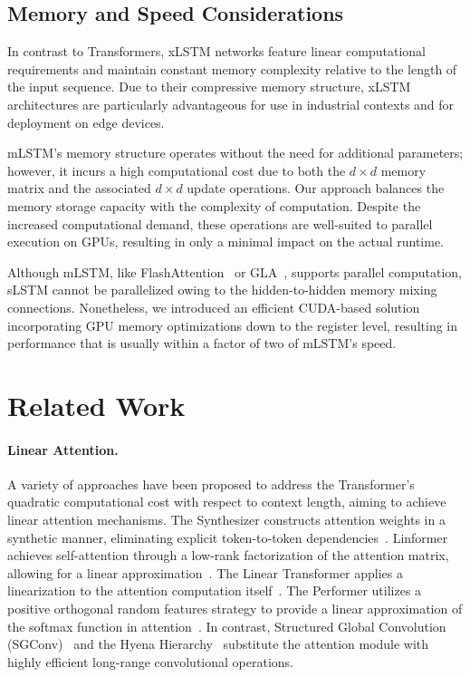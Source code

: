 \subsection{Memory and Speed Considerations}

In contrast to Transformers, xLSTM networks feature linear computational requirements and maintain constant memory complexity relative to the length of the input sequence. Due to their compressive memory structure, xLSTM architectures are particularly advantageous for use in industrial contexts and for deployment on edge devices.

mLSTM's memory structure operates without the need for additional parameters; however, it incurs a high computational cost due to both the $d \times d$ memory matrix and the associated $d \times d$ update operations. Our approach balances the memory storage capacity with the complexity of computation. Despite the increased computational demand, these operations are well-suited to parallel execution on GPUs, resulting in only a minimal impact on the actual runtime.

Although mLSTM, like FlashAttention~\citep{Dao:22,Dao:23} or GLA~\citep{Yang:23arxiv}, supports parallel computation, sLSTM cannot be parallelized owing to the hidden-to-hidden memory mixing connections. Nonetheless, we introduced an efficient CUDA-based solution incorporating GPU memory optimizations down to the register level, resulting in performance that is usually within a factor of two of mLSTM’s speed.

\section{Related Work}
\label{sec:related}

\paragraph{Linear Attention.} A variety of approaches have been proposed to address the Transformer’s quadratic computational cost with respect to context length, aiming to achieve linear attention mechanisms. The Synthesizer constructs attention weights in a synthetic manner, eliminating explicit token-to-token dependencies~\citep{Tay:20arxiv}. Linformer achieves self-attention through a low-rank factorization of the attention matrix, allowing for a linear approximation~\citep{Wang:20arxiv}. The Linear Transformer applies a linearization to the attention computation itself~\citep{Katharopoulos:20}. The Performer utilizes a positive orthogonal random features strategy to provide a linear approximation of the softmax function in attention~\citep{Choromanski:21}. In contrast, Structured Global Convolution (SGConv)~\citep{Li:22} and the Hyena Hierarchy~\citep{Poli:23} substitute the attention module with highly efficient long-range convolutional operations.

